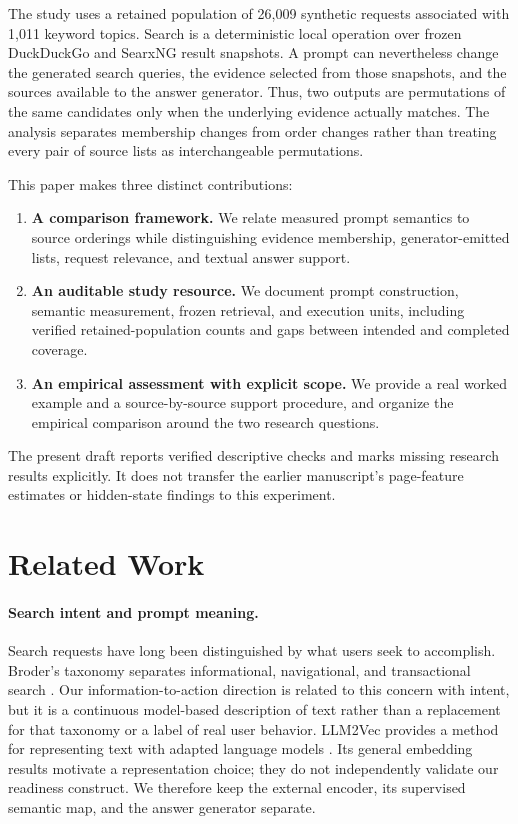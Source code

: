 The study uses a retained population of 26,009 synthetic requests associated with 1,011 keyword topics. Search is a deterministic local operation over frozen DuckDuckGo and SearxNG result snapshots. A prompt can nevertheless change the generated search queries, the evidence selected from those snapshots, and the sources available to the answer generator. Thus, two outputs are permutations of the same candidates only when the underlying evidence actually matches. The analysis separates membership changes from order changes rather than treating every pair of source lists as interchangeable permutations.

This paper makes three distinct contributions:
\begin{enumerate}
\item \textbf{A comparison framework.} We relate measured prompt semantics to source orderings while distinguishing evidence membership, generator-emitted lists, request relevance, and textual answer support.
\item \textbf{An auditable study resource.} We document prompt construction, semantic measurement, frozen retrieval, and execution units, including verified retained-population counts and gaps between intended and completed coverage.
\item \textbf{An empirical assessment with explicit scope.} We provide a real worked example and a source-by-source support procedure, and organize the empirical comparison around the two research questions. 
\end{enumerate}
The present draft reports verified descriptive checks and marks missing research results explicitly. It does not transfer the earlier manuscript's page-feature estimates or hidden-state findings to this experiment.

\section{Related Work}
\paragraph{Search intent and prompt meaning.}
Search requests have long been distinguished by what users seek to accomplish. Broder's taxonomy separates informational, navigational, and transactional search \citep{P006}. Our information-to-action direction is related to this concern with intent, but it is a continuous model-based description of text rather than a replacement for that taxonomy or a label of real user behavior. LLM2Vec provides a method for representing text with adapted language models \citep{P024}. Its general embedding results motivate a representation choice; they do not independently validate our readiness construct. We therefore keep the external encoder, its supervised semantic map, and the answer generator separate.

